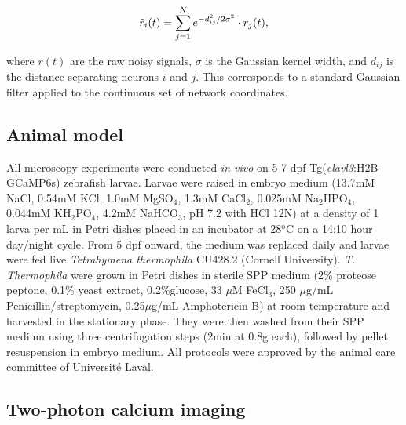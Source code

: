 \documentclass{article}
\begin{document}
$$\Tilde{r}_i(t)=\sum_{j=1}^N e^{-d_{ij}^2/2\sigma^2} \cdot r_j(t), $$

where $r(t)$ are the raw noisy signals, $\sigma$ is the Gaussian kernel width, and $d_{ij}$ is the distance separating neurons $i$ and $j$. This corresponds to a standard Gaussian filter applied to the continuous set of network coordinates.

\subsection*{Animal model}

All microscopy experiments were conducted \textit{in vivo} on 5-7 dpf Tg(\textit{elavl3}:H2B-GCaMP6s)\cite{vladimirov2014light} zebrafish larvae. Larvae were raised in embryo medium (13.7mM NaCl, 0.54mM KCl, 1.0mM MgSO$_{4}$, 1.3mM CaCl$_{2}$, 0.025mM Na$_{2}$HPO$_{4}$, 0.044mM KH$_{2}$PO$_{4}$, 4.2mM NaHCO$_{3}$, pH 7.2 with HCl 12N) at a density of 1 larva per mL in Petri dishes placed in an incubator at 28$^{\text{o}}$C on a 14:10 hour day/night cycle. From 5 dpf onward, the medium was replaced daily and larvae were fed live \textit{Tetrahymena thermophila} CU428.2 (Cornell University). \textit{T. Thermophila} were grown in Petri dishes in sterile SPP medium (2\% proteose peptone, 0.1\% yeast extract, 0.2\%glucose, 33 $\mu$M FeCl$_{3}$, 250 $\mu$g/mL Penicillin/streptomycin, 0.25$\mu$g/mL Amphotericin B) at room temperature and harvested in the stationary phase. They were then washed from their SPP medium using three centrifugation steps (2min at 0.8g each), followed by pellet resuspension in embryo medium. All protocols were approved by the animal care committee of Université Laval.

\subsection*{Two-photon calcium imaging}
\end{document}
